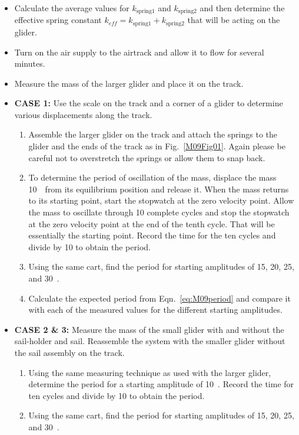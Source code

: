 \begin{itemize}
\begin{enumerate}
  \end{enumerate}
  \item Calculate the average values for $k_{\text{spring1}}$ and $k_{\text{spring2}}$ and then determine the effective spring constant $k_{eff} = k_{\text{spring1}} + k_{\text{spring2}}$ that will be acting on the glider.
\item Turn on the air supply to the airtrack and allow it to flow for several minutes.
\item Measure the mass of the larger glider and place it on the track.
\item \textbf{CASE 1:} Use the scale on the track and a corner of a glider to determine various displacements along the track.
  \begin{enumerate}
  \item Assemble the larger glider on the track and attach the springs to the glider and the ends of the track as in Fig.~\ref{M09Fig01}.  Again please be careful not to overstretch the springs or allow them to snap back.
  \item To determine the period of oscillation of the mass, displace the mass 10~\centi\metre\ from its equilibrium position and release it. When the mass returns to its starting point, start the stopwatch at the zero velocity point.  Allow the mass to oscillate through 10 complete cycles and stop the stopwatch at the zero velocity point at the end of the tenth cycle. That will be essentially the starting point.  Record the time for the ten cycles and divide by 10 to obtain the period.
  \item Using the same cart, find the period for starting amplitudes of 15, 20, 25, and 30~\centi\metre.
  \item Calculate the expected period from Eqn.~\ref{eq:M09period} and compare it with each of the measured values for the different starting amplitudes.
  \end{enumerate} 
\item \textbf{CASE 2 \& 3:} Measure the mass of the small glider with and without the sail-holder and sail. Reassemble the system with the smaller glider without the sail assembly on the track.
  \begin{enumerate}
  \item Using the same measuring technique as used with the larger glider, determine the period for a starting amplitude of 10~\centi\metre.  Record the time for ten cycles and divide by 10 to obtain the period.
  \item Using the same cart, find the period for starting amplitudes of 15, 20, 25, and 30~\centi\metre.

\end{enumerate}
\end{itemize}
